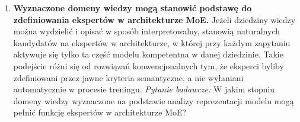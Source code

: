 \begin{enumerate}
    \textit{Pytanie badawcze:} Jakie są granice możliwości izolowania wiedzy dziedzinowej z modelu językowego poprzez technikę przycinania i jak mierzyć utratę jakości wynikającą z tego procesu?
    \item \textbf{Wyznaczone domeny wiedzy mogą stanowić podstawę do zdefiniowania ekspertów w architekturze MoE.}
    Jeżeli dziedziny wiedzy można wydzielić i opisać w sposób interpretowalny, stanowią naturalnych kandydatów na ekspertów w architekturze, w której przy każdym zapytaniu aktywuje się tylko ta część modelu kompetentna w danej dziedzinie. Takie podejście różni się od rozwiązań konwencjonalnych tym, że eksperci byliby zdefiniowani przez jawne kryteria semantyczne, a nie wyłaniani automatycznie w procesie treningu.
    \textit{Pytanie badawcze:} W jakim stopniu domeny wiedzy wyznaczone na podstawie analizy reprezentacji modelu mogą pełnić funkcję ekspertów w architekturze MoE?
\end{enumerate}